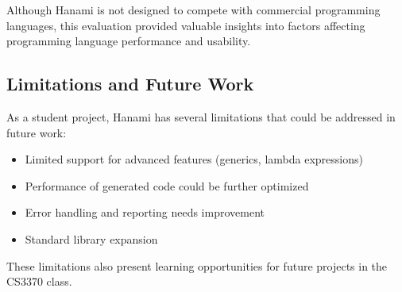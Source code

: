 \documentclass[conference]{IEEEtran}
\begin{document}
	Although Hanami is not designed to compete with commercial programming languages, this evaluation provided valuable insights into factors affecting programming language performance and usability.
	
	\subsection{Limitations and Future Work}
	
	As a student project, Hanami has several limitations that could be addressed in future work:
	
	\begin{itemize}
		\item Limited support for advanced features (generics, lambda expressions)
		\item Performance of generated code could be further optimized
		\item Error handling and reporting needs improvement
		\item Standard library expansion
	\end{itemize}
	
	These limitations also present learning opportunities for future projects in the CS3370 class.
	
	
	
	
\end{document}
